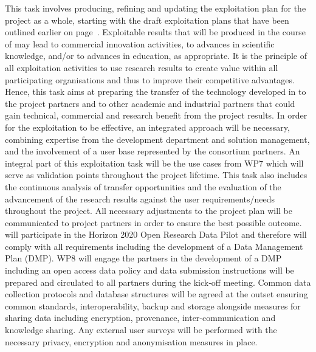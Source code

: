 \begin{Workpackage}{\thewpno}
\begin{Task}
This task involves producing, refining and updating the exploitation plan for the project as a whole, starting with the draft exploitation plans that have been outlined earlier on page~\pageref{sect:exploitation-plan}.
Exploitable results that will be produced in the course of \TheProject may lead to commercial innovation activities, to advances in scientific knowledge, and/or to advances in education, as appropriate.
It is the principle of all exploitation activities to use research results to create value within all participating organisations and thus to improve their competitive advantages.
\taskbreak
Hence, this task aims at preparing the transfer of the technology developed in \TheProject{} to the project partners and to other academic and industrial partners that could gain technical, commercial and research benefit from the project results. 
In order for the exploitation to be effective, an integrated approach will be necessary, combining expertise from the development department and solution management, and the involvement of a user base represented by the consortium partners. 
An integral part of this exploitation task will be the \TheProject{} use cases from WP7 which will serve as validation points throughout the project lifetime.
This task also includes the continuous analysis of transfer opportunities and the evaluation of the advancement of the research results against the user requirements/needs throughout the project.
All necessary adjustments to the project plan will be communicated to project partners  in order to ensure the best possible outcome. \TheProject{} will participate in the Horizon 2020 Open Research Data Pilot and therefore will comply with all
requirements including the development of a Data Management Plan (DMP). WP8 will engage the \TheProject{}
partners in the development of a DMP including an open access data policy and data submission instructions will
be prepared and circulated to all partners during the kick‐off meeting. Common data collection protocols and database structures will be agreed at the outset ensuring common
standards, interoperability, backup and storage alongside measures for sharing data including 
encryption, provenance, inter‐communication and knowledge sharing. Any external user surveys will be performed
with the necessary privacy, encryption and anonymisation measures in place.
\end{Task}

\begin{Task}



\end{Task}
\end{Workpackage}
